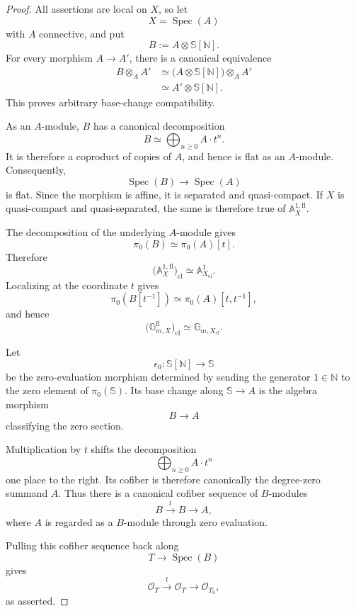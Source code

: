 \begin{proof}
All assertions are local on \(X\), so let
\[
    X=\operatorname{Spec}(A)
\]
with \(A\) connective, and put
\[
    B:=A\otimes\mathbb S[\mathbb N].
\]
For every morphism \(A\to A'\), there is a canonical equivalence
\[
\begin{aligned}
    B\otimes_AA'
    &\simeq
    \bigl(
      A\otimes\mathbb S[\mathbb N]
    \bigr)
    \otimes_AA' \\
    &\simeq
    A'\otimes\mathbb S[\mathbb N].
\end{aligned}
\]
This proves arbitrary base-change compatibility.

As an \(A\)-module, \(B\) has a canonical decomposition
\[
    B
    \simeq
    \bigoplus_{n\geq0}A\cdot t^n.
\]
It is therefore a coproduct of copies of \(A\), and hence is flat as an
\(A\)-module.  Consequently,
\[
    \operatorname{Spec}(B)
    \longrightarrow
    \operatorname{Spec}(A)
\]
is flat.  Since the morphism is affine, it is separated and quasi-compact.
If \(X\) is quasi-compact and quasi-separated, the same is therefore true
of \(\mathbb A^{1,\mathrm{fl}}_X\).

The decomposition of the underlying \(A\)-module gives
\[
    \pi_0(B)
    \simeq
    \pi_0(A)[t].
\]
Therefore
\[
    \bigl(
      \mathbb A^{1,\mathrm{fl}}_X
    \bigr)_{\mathrm{cl}}
    \simeq
    \mathbb A^1_{X_{\mathrm{cl}}}.
\]
Localizing at the coordinate \(t\) gives
\[
    \pi_0(B[t^{-1}])
    \simeq
    \pi_0(A)[t,t^{-1}],
\]
and hence
\[
    \bigl(
      \mathbb G^{\mathrm{fl}}_{m,X}
    \bigr)_{\mathrm{cl}}
    \simeq
    \mathbb G_{m,X_{\mathrm{cl}}}.
\]

Let
\[
    \epsilon_0:
    \mathbb S[\mathbb N]
    \longrightarrow
    \mathbb S
\]
be the zero-evaluation morphism determined by sending the generator
\(1\in\mathbb N\) to the zero element of \(\pi_0(\mathbb S)\).  Its base
change along \(\mathbb S\to A\) is the algebra morphism
\[
    B
    \longrightarrow
    A
\]
classifying the zero section.

Multiplication by \(t\) shifts the decomposition
\[
    \bigoplus_{n\geq0}A\cdot t^n
\]
one place to the right.  Its cofiber is therefore canonically the degree-zero
summand \(A\).  Thus there is a canonical cofiber sequence of \(B\)-modules
\[
    B
    \xrightarrow{t}
    B
    \longrightarrow
    A,
\]
where \(A\) is regarded as a \(B\)-module through zero evaluation.

Pulling this cofiber sequence back along
\[
    T\longrightarrow\operatorname{Spec}(B)
\]
gives
\[
    \mathcal O_T
    \xrightarrow{t}
    \mathcal O_T
    \longrightarrow
    \mathcal O_{T_0},
\]
as asserted.
\end{proof}

